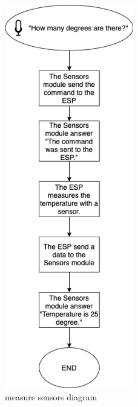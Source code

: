 \begin{figure}[H]
    \centering
    \includegraphics[width=0.5\textwidth]{img/measure_sensors_diagram.png}
    \caption{measure sensors diagram}
\end{figure}

